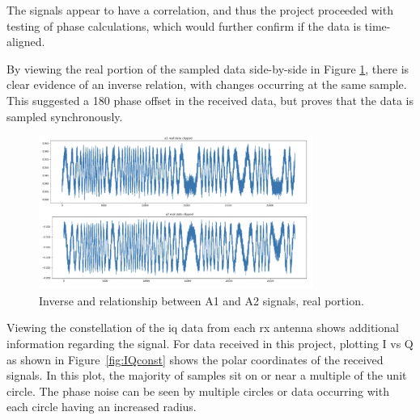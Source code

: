 \documentclass[class=report,11pt,crop=false]{standalone}
\begin{document}
The signals appear to have a correlation, and thus the project proceeded with testing of phase calculations, which would further confirm if the data is time-aligned.

By viewing the real portion of the sampled data side-by-side in Figure \ref{fig:inverse}, there is clear evidence of an inverse relation, with changes occurring at the same sample. This suggested a 180 phase offset in the received data, but proves that the data is sampled synchronously.  

\begin{figure}[h!]
    \vspace{0.5cm}
    \centering
    \includegraphics[width=0.8\textwidth]{Images/plots/inverserelation.png}
    \caption{Inverse and relationship between A1 and A2 signals, real portion.}
    \label{fig:inverse}
\end{figure}

Viewing the constellation of the \gls{iq} data from each \gls{rx} antenna shows additional information regarding the signal. For data received in this project, plotting I vs Q as shown in Figure~\ref{fig:IQconst} shows the polar coordinates of the received signals. In this plot, the majority of samples sit on or near a multiple of the unit circle. The phase noise can be seen by multiple circles or data occurring with each circle having an increased radius.
\end{document}
